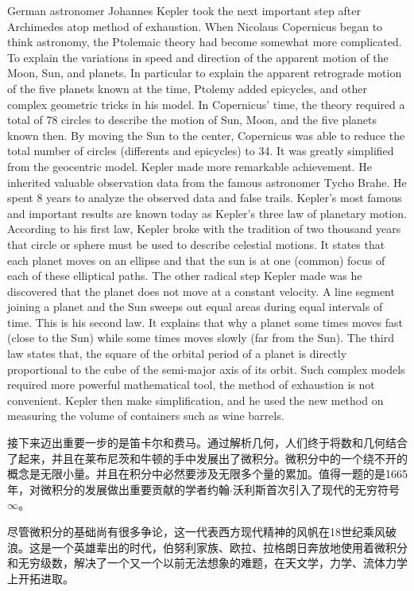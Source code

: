\documentclass{article}
\begin{document}
German astronomer Johannes Kepler took the next important step after Archimedes atop method of exhaustion. When Nicolaus Copernicus began to think astronomy, the Ptolemaic theory had become somewhat more complicated. To explain the variations in speed and direction of the apparent motion of the Moon, Sun, and planets. In particular to explain the apparent retrograde motion of the five planets known at the time, Ptolemy added epicycles, and other complex geometric tricks in his model. In Copernicus' time, the theory required a total of 78 circles to describe the motion of Sun, Moon, and the five planets known then. By moving the Sun to the center, Copernicus was able to reduce the total number of circles (differents and epicycles) to 34. It was greatly simplified from the geocentric model. Kepler made more remarkable achievement. He inherited valuable observation data from the famous astronomer Tycho Brahe. He spent 8 years to analyze the observed data and false trails. Kepler's most famous and important results are known today as Kepler's three law of planetary motion. According to his first law, Kepler broke with the tradition of two thousand years that circle or sphere must be used to describe celestial motions. It states that each planet moves on an ellipse and that the sun is at one (common) focus of each of these elliptical paths. The other radical step Kepler made was he discovered that the planet does not move at a constant velocity. A line segment joining a planet and the Sun sweeps out equal areas during equal intervals of time. This is his second law. It explains that why a planet some times moves fast (close to the Sun) while some times moves slowly (far from the Sun). The third law states that, the square of the orbital period of a planet is directly proportional to the cube of the semi-major axis of its orbit. Such complex models required more powerful mathematical tool, the method of exhaustion is not convenient. Kepler then make simplification, and he used the new method on measuring the volume of containers such as wine barrels.

接下来迈出重要一步的是笛卡尔和费马。通过解析几何，人们终于将数和几何结合了起来，并且在莱布尼茨和牛顿的手中发展出了微积分。微积分中的一个绕不开的概念是无限小量。并且在积分中必然要涉及无限多个量的累加。值得一题的是1665年，对微积分的发展做出重要贡献的学者约翰$\cdot$沃利斯首次引入了现代的无穷符号$\infty$。

尽管微积分的基础尚有很多争论，这一代表西方现代精神的风帆在18世纪乘风破浪。这是一个英雄辈出的时代，伯努利家族、欧拉、拉格朗日奔放地使用着微积分和无穷级数，解决了一个又一个以前无法想象的难题，在天文学，力学、流体力学上开拓进取。
\end{document}
